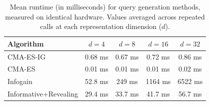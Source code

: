 \begin{table}[t]
\centering
\caption{Mean runtime (in milliseconds) for query generation methods, measured on identical hardware. Values averaged across repeated calls at each representation dimension ($d$).}
\label{tab:runtime}
\begin{tabular}{l cccc}
\toprule
\textbf{Algorithm} & $d=4$ & $d=8$ & $d=16$ & $d=32$ \\
\midrule
CMA-ES-IG & 0.68 ms & 0.67 ms & 0.72 ms & 0.86 ms \\
CMA-ES & 0.01 ms & 0.01 ms & 0.01 ms & 0.02 ms \\
Infogain & 52.8 ms & 249 ms & 1164 ms & 6522 ms \\
Informative+Revealing & 29.4 ms & 33.7 ms & 41.7 ms & 56.7 ms \\
\bottomrule
\end{tabular}
\end{table}
